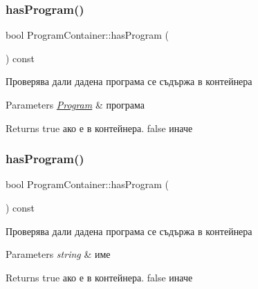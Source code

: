 \subsubsection{\texorpdfstring{has\+Program()}{hasProgram()}\hspace{0.1cm}{\footnotesize\ttfamily [1/2]}}
{\footnotesize\ttfamily bool Program\+Container\+::has\+Program (\begin{DoxyParamCaption}\item[{const \hyperlink{class_program}{Program} \&}]{ }\end{DoxyParamCaption}) const}



Проверява дали дадена програма се съдържа в контейнера 


\begin{DoxyParams}{Parameters}
{\em \hyperlink{class_program}{Program}} & програма \\
\hline
\end{DoxyParams}
\begin{DoxyReturn}{Returns}
true ако е в контейнера. false иначе 
\end{DoxyReturn}
\mbox{\label{class_program_container_a395e4e5881d1cabca7d429e386610014}} 
\subsubsection{\texorpdfstring{has\+Program()}{hasProgram()}\hspace{0.1cm}{\footnotesize\ttfamily [2/2]}}
{\footnotesize\ttfamily bool Program\+Container\+::has\+Program (\begin{DoxyParamCaption}\item[{const std\+::string \&}]{ }\end{DoxyParamCaption}) const}



Проверява дали дадена програма се съдържа в контейнера 


\begin{DoxyParams}{Parameters}
{\em string} & име \\
\hline
\end{DoxyParams}
\begin{DoxyReturn}{Returns}
true ако е в контейнера. false иначе 
\end{DoxyReturn}
\mbox{\label{class_program_container_aa9c5c2ef50338c70e82d36b058f2c202}} 
